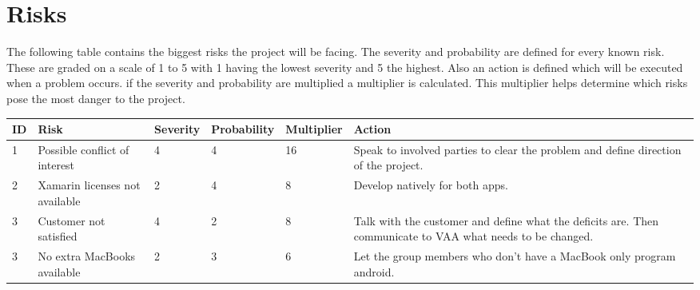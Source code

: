 \section{Risks}
The following table contains the biggest risks the project will be facing. The severity and probability are defined for every known risk. These are graded on a scale of 1 to 5 with 1 having the lowest severity and 5 the highest. Also an action is defined which will be executed when a problem occurs. if the severity and probability are multiplied a multiplier is calculated. This multiplier helps determine which risks pose the most danger to the project.

\begin{tabular}{| p{} | p{3cm} | p{} | p{2cm} | p{} | p{4cm} |}
	\hline
	ID & Risk & Severity & Probability & Multiplier & Action \\
	\hline
	1 & Possible conflict of interest  & 4 & 4 & 16 & Speak to involved parties to clear the problem and define direction of the project. \\
	\hline
	2 & Xamarin licenses not available & 2 & 4 & 8 & Develop natively for both apps. \\
	\hline
	3 & Customer not satisfied  & 4 & 2 & 8 & Talk with the customer and define what the deficits are. Then communicate to VAA what needs to be changed.\\
	\hline
	3 & No extra MacBooks available  & 2 & 3 & 6 & Let the group members who don't have a MacBook only program android. \\
	\hline
	
\end{tabular}
